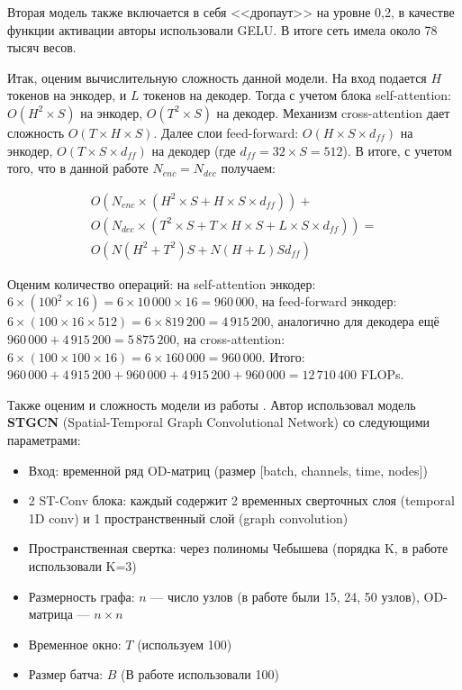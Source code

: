 Вторая модель также включается в себя <<дропаут>> на уровне 0,2, в качестве функции активации авторы использовали GELU. В итоге сеть имела около 78 тысяч весов.


Итак, оценим вычислительную сложность данной модели. На вход подается $H$ токенов на энкодер, и $L$ токенов на декодер. Тогда с учетом блока self-attention: $O(H^2 \times S)$ на энкодер, $O(T^2 \times S)$ на декодер. Механизм cross-attention дает сложность $O(T \times H \times S)$. Далее слои feed-forward: $O(H \times S \times d_{ff})$ на энкодер, $O(T \times S \times d_{ff})$ на декодер (где $d_{ff} = 32 \times S = 512$). В итоге, с учетом того, что в данной работе $N_{enc} = N_{dec}$ получаем:

\begin{equation}
	\begin{split}
		O(N_{enc} \times (H^2 \times S + H \times S \times d_{ff})) + \\ O(N_{dec} \times (T^2 \times S + T \times H \times S + L \times S \times d_{ff})) = \\
		O(N(H^2+T^2)S + N(H+L)S d_{ff}) 
	\end{split}
\end{equation}


Оценим количество операций: на self-attention энкодер: $6 \times (100^2 \times 16) = 6 \times 10\,000 \times 16 = 960\,000$, на feed-forward энкодер: $6 \times (100 \times 16 \times 512) = 6 \times 819\,200 = 4\,915\,200$, аналогично для декодера ещё $960\,000 + 4\,915\,200 = 5\,875\,200$, на cross-attention: $6 \times (100 \times 100 \times 16) = 6 \times 160\,000 = 960\,000$. Итого: $960\,000 + 4\,915\,200 + 960\,000 + 4\,915\,200 + 960\,000 = 12\,710\,400$
FLOPs.

Также оценим и сложность модели из работы \cite{ge2022gnn}. Автор использовал модель \textbf{STGCN} (Spatial-Temporal Graph Convolutional Network) со следующими параметрами:

\begin{itemize}
	\item Вход: временной ряд OD-матриц (размер [batch, channels, time, nodes])
	\item 2 ST-Conv блока: каждый содержит 2 временных сверточных слоя (temporal 1D conv) и 1 пространственный слой (graph convolution)
	\item Пространственная свертка: через полиномы Чебышева (порядка K, в работе использовали K=3)
	\item Размерность графа: $n$ — число узлов (в работе были 15, 24, 50 узлов), OD-матрица — $n \times n$
	\item Временное окно: $T$ (используем 100)
	\item Размер батча: $B$ (В работе использовали 100)
	
\end{itemize}

